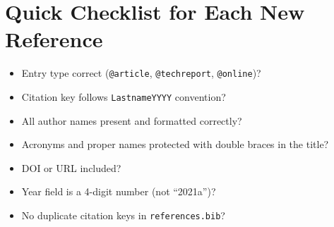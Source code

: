 \documentclass[11pt, a4paper]{article}
\begin{document}
\section{Quick Checklist for Each New Reference}

\begin{itemize}
  \item[$\square$] Entry type correct (\texttt{@article}, \texttt{@techreport},
        \texttt{@online})?
  \item[$\square$] Citation key follows \texttt{LastnameYYYY} convention?
  \item[$\square$] All author names present and formatted correctly?
  \item[$\square$] Acronyms and proper names protected with double braces
        in the title?
  \item[$\square$] DOI or URL included?
  \item[$\square$] Year field is a 4-digit number (not ``2021a'')?
  \item[$\square$] No duplicate citation keys in \texttt{references.bib}?
\end{itemize}
\end{document}
